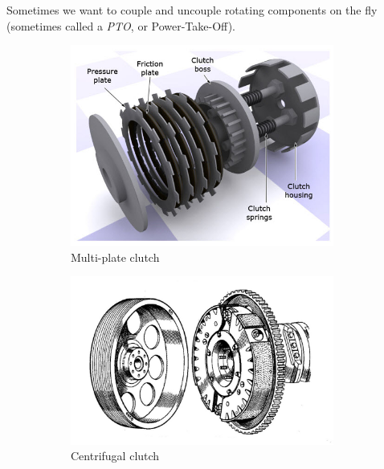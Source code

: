 \documentclass[10pt,letterpaper]{book}
\begin{document}
Sometimes we want to couple and uncouple rotating components on the fly (sometimes called a \textit{PTO}, or Power-Take-Off).

\begin{figure}[H]
	\begin{subfigure}[b]{.32\linewidth}
		\includegraphics[width=0.95\textwidth]{imgs/plate_clutch.jpeg}
		\caption{Multi-plate clutch}
	\end{subfigure}\begin{subfigure}[b]{.32\linewidth}
		\includegraphics[width=0.95\textwidth]{imgs/centrif_clutch.jpeg}
		\caption{Centrifugal clutch}
	\end{subfigure}\begin{subfigure}[b]{.32\linewidth}

\end{subfigure}
\end{figure}
\end{document}
